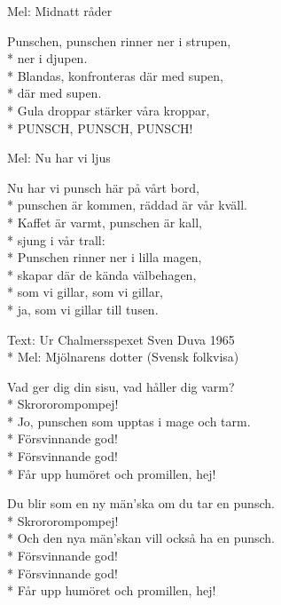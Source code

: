 \begin{SongText}
    \begin{SongInfo}
        Mel: Midnatt råder
    \end{SongInfo}
    \begin{SongVerse}
        Punschen, punschen rinner ner i strupen,\\*%
        ner i djupen.\\*%
        Blandas, konfronteras där med supen,\\*%
        där med supen.\\*%
        Gula droppar stärker våra kroppar,\\*%
        PUNSCH, PUNSCH, PUNSCH!
    \end{SongVerse}\end{SongText}
\begin{SongText}
    \begin{SongInfo}
        Mel: Nu har vi ljus
    \end{SongInfo}
    \begin{SongVerse}
        Nu har vi punsch här på vårt bord,\\*%
        punschen är kommen, räddad är vår kväll.\\*%
        Kaffet är varmt, punschen är kall,\\*%
        sjung i vår trall:\\*%
        Punschen rinner ner i lilla magen,\\*%
        skapar där de kända välbehagen,\\*%
        som vi gillar, som vi gillar,\\*%
        ja, som vi gillar till tusen.
    \end{SongVerse}\end{SongText}
\begin{SongText}
    \begin{SongInfo}
        Text: Ur Chalmersspexet Sven Duva 1965\\*%
        Mel: Mjölnarens dotter (Svensk folkvisa)
    \end{SongInfo}
    \begin{SongVerse}
        Vad ger dig din sisu, vad håller dig varm?\\*%
        Skrororompompej!\\*%
        Jo, punschen som upptas i mage och tarm.\\*%
        Försvinnande god!\\*%
        Försvinnande god!\\*%
        Får upp humöret och promillen, hej!
    \end{SongVerse}
    \begin{SongVerse}
        Du blir som en ny män’ska om du tar en punsch.\\*%
        Skrororompompej!\\*%
        Och den nya män’skan vill också ha en punsch.\\*%
        Försvinnande god!\\*%
        Försvinnande god!\\*%
        Får upp humöret och promillen, hej!
    \end{SongVerse}\end{SongText}
